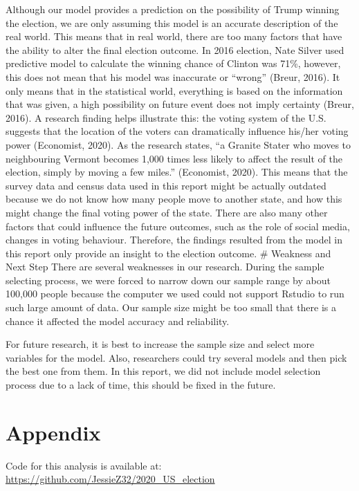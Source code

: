 \documentclass[
]{article}
\begin{document}
Although our model provides a prediction on the possibility of Trump
winning the election, we are only assuming this model is an accurate
description of the real world. This means that in real world, there are
too many factors that have the ability to alter the final election
outcome. In 2016 election, Nate Silver used predictive model to
calculate the winning chance of Clinton was 71\%, however, this does not
mean that his model was inaccurate or ``wrong'' (Breur, 2016). It only
means that in the statistical world, everything is based on the
information that was given, a high possibility on future event does not
imply certainty (Breur, 2016). A research finding helps illustrate this:
the voting system of the U.S. suggests that the location of the voters
can dramatically influence his/her voting power (Economist, 2020). As
the research states, ``a Granite Stater who moves to neighbouring
Vermont becomes 1,000 times less likely to affect the result of the
election, simply by moving a few miles.'' (Economist, 2020). This means
that the survey data and census data used in this report might be
actually outdated because we do not know how many people move to another
state, and how this might change the final voting power of the state.
There are also many other factors that could influence the future
outcomes, such as the role of social media, changes in voting behaviour.
Therefore, the findings resulted from the model in this report only
provide an insight to the election outcome. \# Weakness and Next Step
There are several weaknesses in our research. During the sample
selecting process, we were forced to narrow down our sample range by
about 100,000 people because the computer we used could not support
Rstudio to run such large amount of data. Our sample size might be too
small that there is a chance it affected the model accuracy and
reliability.

For future research, it is best to increase the sample size and select
more variables for the model. Also, researchers could try several models
and then pick the best one from them. In this report, we did not include
model selection process due to a lack of time, this should be fixed in
the future.

\hypertarget{appendix}{%
\section{Appendix}\label{appendix}}

Code for this analysis is available at:
\url{https://github.com/JessieZ32/2020_US_election}
\end{document}
